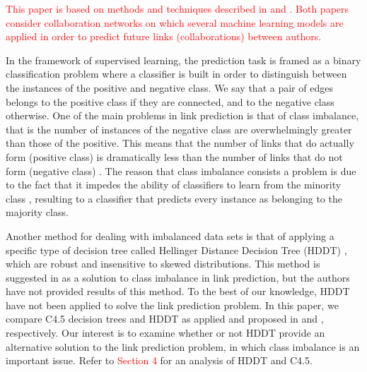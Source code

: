 \documentclass{acm_proc_article-sp}
\begin{document}



\textcolor{red}{This paper is based on methods and techniques described in \cite{Hasan06linkprediction} and \cite{Lichtenwalter:2010:NPM:1835804.1835837}. Both papers consider collaboration networks on which several machine learning models are applied in order to predict future links (collaborations) between authors.} 

In the framework of supervised learning, the prediction task is framed as a binary classification problem where a classifier is built in order to distinguish between the instances of the positive and negative class. We say that a pair of edges belongs to the positive class if they are connected, and to the negative class otherwise. One of the main problems in link prediction is that of class imbalance, that is the number of instances of the negative class are overwhelmingly greater than those of the positive. This means that the number of links that do actually form (positive class) is dramatically less than the number of links that do not form (negative class) \cite{Lichtenwalter:2010:NPM:1835804.1835837}. The reason that class imbalance consists a problem is due to the fact that it impedes the ability of classifiers to learn from the minority class \cite{Cieslak2012}, resulting to a classifier that predicts every instance as belonging to the majority class. 
 
Another method for dealing with imbalanced data sets is that of applying a specific type of decision tree called Hellinger Distance Decision Tree (HDDT) \cite{Cieslak2008, Cieslak2012}, which are robust and insensitive to skewed distributions. This method is suggested in \cite{Lichtenwalter:2010:NPM:1835804.1835837} as a solution to class imbalance in link prediction, but the authors have not provided results of this method. To the best of our knowledge, HDDT have not been applied to solve the link prediction problem. In this paper, we compare C4.5 decision trees \cite{quinlan2014c4} and HDDT as applied and proposed in \cite{Hasan06linkprediction} and \cite{Lichtenwalter:2010:NPM:1835804.1835837}, respectively. Our interest is to examine whether or not HDDT provide an alternative solution to the link prediction problem, in which class imbalance is an important issue. Refer to \textcolor{red}{Section 4} for an analysis of HDDT and C4.5.
\end{document}
